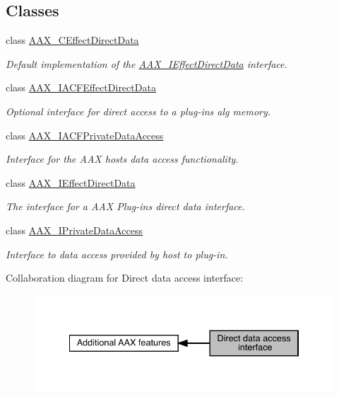 \subsection*{Classes}
\begin{DoxyCompactItemize}
\item 
class \mbox{\hyperlink{a01473}{A\+A\+X\+\_\+\+C\+Effect\+Direct\+Data}}
\begin{DoxyCompactList}\small\item\em Default implementation of the \mbox{\hyperlink{a01817}{A\+A\+X\+\_\+\+I\+Effect\+Direct\+Data}} interface. \end{DoxyCompactList}\item 
class \mbox{\hyperlink{a01661}{A\+A\+X\+\_\+\+I\+A\+C\+F\+Effect\+Direct\+Data}}
\begin{DoxyCompactList}\small\item\em Optional interface for direct access to a plug-\/in\textquotesingle{}s alg memory. \end{DoxyCompactList}\item 
class \mbox{\hyperlink{a01741}{A\+A\+X\+\_\+\+I\+A\+C\+F\+Private\+Data\+Access}}
\begin{DoxyCompactList}\small\item\em Interface for the A\+AX host\textquotesingle{}s data access functionality. \end{DoxyCompactList}\item 
class \mbox{\hyperlink{a01817}{A\+A\+X\+\_\+\+I\+Effect\+Direct\+Data}}
\begin{DoxyCompactList}\small\item\em The interface for a A\+AX Plug-\/in\textquotesingle{}s direct data interface. \end{DoxyCompactList}\item 
class \mbox{\hyperlink{a01865}{A\+A\+X\+\_\+\+I\+Private\+Data\+Access}}
\begin{DoxyCompactList}\small\item\em Interface to data access provided by host to plug-\/in. \end{DoxyCompactList}\end{DoxyCompactItemize}
Collaboration diagram for Direct data access interface\+:
\nopagebreak
\begin{figure}[H]
\begin{center}
\leavevmode
\includegraphics[width=335pt]{a00803}
\end{center}
\end{figure}
